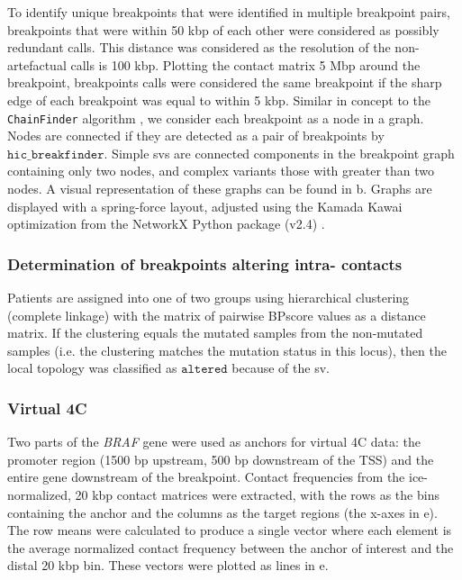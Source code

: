 To identify unique breakpoints that were identified in multiple breakpoint pairs, breakpoints that were within 50 kbp of each other were considered as possibly redundant calls.
This distance was considered as the resolution of the non-artefactual calls is 100 kbp.
Plotting the contact matrix 5 Mbp around the breakpoint, breakpoints calls were considered the same breakpoint if the sharp edge of each breakpoint was equal to within 5 kbp.
Similar in concept to the \texttt{ChainFinder} algorithm \cite{bacaPunctuatedEvolutionProstate2013}, we consider each breakpoint as a node in a graph.
Nodes are connected if they are detected as a pair of breakpoints by $\texttt{hic\_breakfinder}$.
Simple \glspl{sv} are connected components in the breakpoint graph containing only two nodes, and complex variants those with greater than two nodes.
A visual representation of these graphs can be found in b.
Graphs are displayed with a spring-force layout, adjusted using the Kamada Kawai optimization \cite{kamadaAlgorithmDrawingGeneral1989} from the NetworkX Python package (v2.4) \cite{hagbergExploringNetworkStructure2008}.

\subsubsection{Determination of  breakpoints altering intra- contacts}

Patients are assigned into one of two groups using hierarchical clustering (complete linkage) with the matrix of pairwise BPscore \cite{zaborowskiBPscoreEffectiveMetric2019} values as a distance matrix.
If the clustering equals the mutated samples from the non-mutated samples (i.e. the clustering matches the mutation status in this locus), then the local topology was classified as $\texttt{altered}$ because of the \gls{sv}.

\subsubsection{Virtual 4C}

Two parts of the \emph{BRAF} gene were used as anchors for virtual 4C data: the promoter region (1500 bp upstream, 500 bp downstream of the TSS) and the entire gene downstream of the breakpoint.
Contact frequencies from the \gls{ice}-normalized, 20 kbp contact matrices were extracted, with the rows as the bins containing the anchor and the columns as the target regions (the x-axes in e).
The row means were calculated to produce a single vector where each element is the average normalized contact frequency between the anchor of interest and the distal 20 kbp bin.
These vectors were plotted as lines in e.


